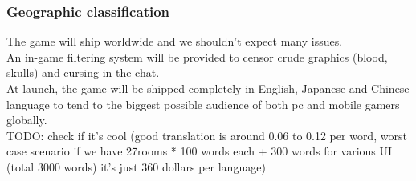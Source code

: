 \subsubsection{Geographic classification}
The game will ship worldwide and we shouldn't expect many issues. \\

An in-game filtering system will be provided to censor crude graphics (blood, skulls) and cursing in the chat. \\

At launch, the game will be shipped completely in English, Japanese and Chinese language to tend to the biggest possible audience of both pc and mobile gamers globally. \\

TODO: check if it's cool (good translation is around 0.06 to 0.12 per word, worst case scenario if we have 27rooms * 100 words each + 300 words for various UI (total 3000 words) it's just 360 dollars per language)

\clearpage